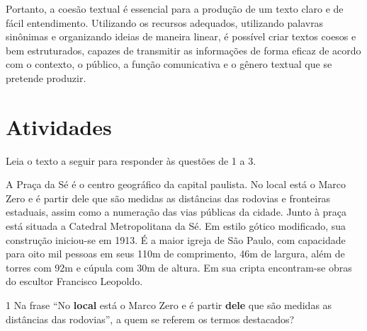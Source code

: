 {{Portanto, a coesão textual é essencial para a produção de um texto claro
e de fácil entendimento. Utilizando os recursos adequados, utilizando palavras 
sinônimas e organizando ideias de maneira linear, é possível criar textos coesos
e bem estruturados, capazes de transmitir as informações de forma eficaz de acordo 
com o contexto, o público, a função comunicativa e o gênero textual que se pretende
produzir.}



\section{Atividades}

Leia o texto a seguir para responder às questões de 1 a 3.

\begin{myquote}

A Praça da Sé é o centro geográfico da capital paulista. No local está o Marco Zero 
e é partir dele que são medidas as distâncias das rodovias e fronteiras estaduais, 
assim como a numeração das vias públicas da cidade. Junto à praça está situada a 
Catedral Metropolitana da Sé. Em estilo gótico modificado, sua construção iniciou-se em 1913.
É a maior igreja de São Paulo, com capacidade para oito mil pessoas em seus 110m de comprimento, 
46m de largura, além de torres com 92m e cúpula com 30m de altura. Em sua cripta encontram-se
obras do escultor Francisco Leopoldo.

\end{myquote}


\num{1} Na frase ``No \textbf{local} está o Marco Zero e é partir \textbf{dele} que são medidas
as distâncias das rodovias'', a quem se referem os termos destacados?

}

